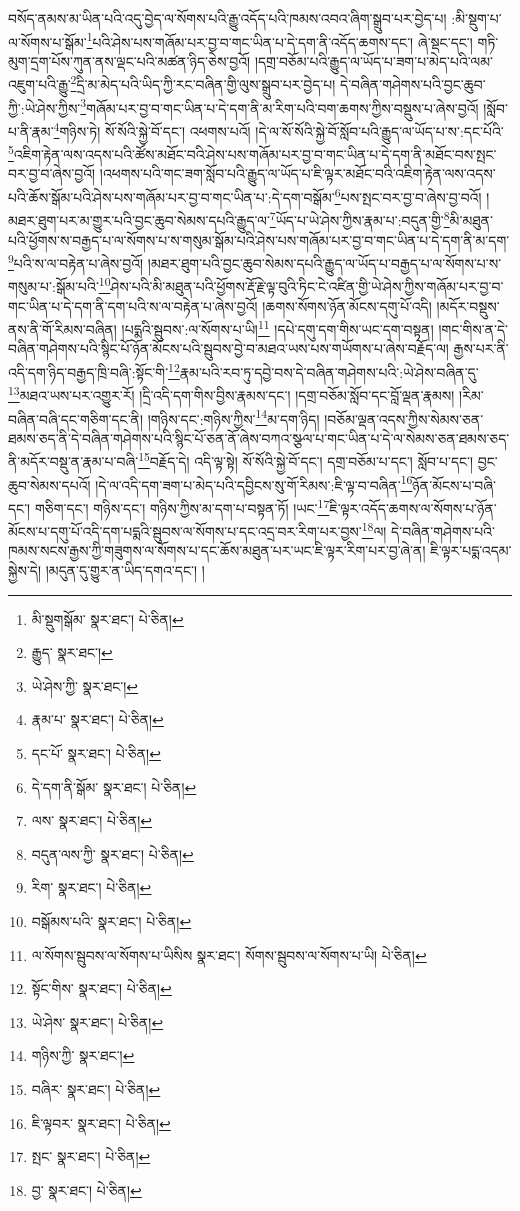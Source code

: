བསོད་ནམས་མ་ཡིན་པའི་འདུ་བྱེད་ལ་སོགས་པའི་རྒྱུ་འདོད་པའི་ཁམས་འབའ་ཞིག་སྒྲུབ་པར་བྱེད་པ། :མི་སྡུག་པ་ལ་སོགས་པ་སྒོམ་\footnote{མི་སྡུགསྒོམ་  སྣར་ཐང་།  པེ་ཅིན། }པའི་ཤེས་པས་གཞོམ་པར་བྱ་བ་གང་ཡིན་པ་དེ་དག་ནི་འདོད་ཆགས་དང་། ཞེ་སྡང་དང་། གཏི་མུག་དྲག་པོས་ཀུན་ནས་ལྡང་པའི་མཚན་ཉིད་ཅེས་བྱའོ། །དགྲ་བཅོམ་པའི་རྒྱུད་ལ་ཡོད་པ་ཟག་པ་མེད་པའི་ལམ་འཇུག་པའི་རྒྱུ་\footnote{རྒྱུད་  སྣར་ཐང་། }དྲི་མ་མེད་པའི་ཡིད་ཀྱི་རང་བཞིན་གྱི་ལུས་སྒྲུབ་པར་བྱེད་པ། དེ་བཞིན་གཤེགས་པའི་བྱང་ཆུབ་ཀྱི་:ཡེ་ཤེས་ཀྱིས་\footnote{ཡེ་ཤེས་ཀྱི་  སྣར་ཐང་། }གཞོམ་པར་བྱ་བ་གང་ཡིན་པ་དེ་དག་ནི་མ་རིག་པའི་བག་ཆགས་ཀྱིས་བསྡུས་པ་ཞེས་བྱའོ། །སློབ་པ་ནི་རྣམ་\footnote{རྣམ་པ་  སྣར་ཐང་།  པེ་ཅིན། }གཉིས་ཏེ། སོ་སོའི་སྐྱེ་བོ་དང་། འཕགས་པའོ། །དེ་ལ་སོ་སོའི་སྐྱེ་བོ་སློབ་པའི་རྒྱུད་ལ་ཡོད་པ་ས་:དང་པོའི་\footnote{དང་པོ་  སྣར་ཐང་།  པེ་ཅིན། }འཇིག་རྟེན་ལས་འདས་པའི་ཚོས་མཐོང་བའི་ཤེས་པས་གཞོམ་པར་བྱ་བ་གང་ཡིན་པ་དེ་དག་ནི་མཐོང་བས་སྤང་བར་བྱ་བ་ཞེས་བྱའོ། །འཕགས་པའི་གང་ཟག་སློབ་པའི་རྒྱུད་ལ་ཡོད་པ་ཇི་ལྟར་མཐོང་བའི་འཇིག་རྟེན་ལས་འདས་པའི་ཆོས་སྒོམ་པའི་ཤེས་པས་གཞོམ་པར་བྱ་བ་གང་ཡིན་པ་:དེ་དག་བསྒོམ་\footnote{དེ་དག་ནི་སྒོམ་  སྣར་ཐང་།  པེ་ཅིན། }པས་སྤང་བར་བྱ་བ་ཞེས་བྱ་བའོ། །མཐར་ཐུག་པར་མ་གྱུར་པའི་བྱང་ཆུབ་སེམས་དཔའི་རྒྱུད་ལ་\footnote{ལས་  སྣར་ཐང་།  པེ་ཅིན། }ཡོད་པ་ཡེ་ཤེས་ཀྱིས་རྣམ་པ་:བདུན་གྱི་\footnote{བདུན་ལས་ཀྱི་  སྣར་ཐང་།  པེ་ཅིན། }མི་མཐུན་པའི་ཕྱོགས་ས་བརྒྱད་པ་ལ་སོགས་པ་ས་གསུམ་སྒོམ་པའི་ཤེས་པས་གཞོམ་པར་བྱ་བ་གང་ཡིན་པ་དེ་དག་ནི་མ་དག་\footnote{རིག་  སྣར་ཐང་།  པེ་ཅིན། }པའི་ས་ལ་བརྟེན་པ་ཞེས་བྱའོ། །མཐར་ཐུག་པའི་བྱང་ཆུབ་སེམས་དཔའི་རྒྱུད་ལ་ཡོད་པ་བརྒྱད་པ་ལ་སོགས་པ་ས་གསུམ་པ་:སྒོམ་པའི་\footnote{བསྒོམས་པའི་  སྣར་ཐང་།  པེ་ཅིན། }ཤེས་པའི་མི་མཐུན་པའི་ཕྱོགས་རྡོ་རྗེ་ལྟ་བུའི་ཏིང་ངེ་འཛིན་གྱི་ཡེ་ཤེས་ཀྱིས་གཞོམ་པར་བྱ་བ་གང་ཡིན་པ་དེ་དག་ནི་དག་པའི་ས་ལ་བརྟེན་པ་ཞེས་བྱའོ། །ཆགས་སོགས་ཉོན་མོངས་དགུ་པོ་འདི། །མདོར་བསྡུས་ནས་ནི་གོ་རིམས་བཞིན། །པདྨའི་སྦུབས་:ལ་སོགས་པ་ཡི།\footnote{ལ་སོགས་སྦུབས་ལ་སོགས་པ་ཡིསིས  སྣར་ཐང་། སོགས་སྦུབས་ལ་སོགས་པ་ཡི།  པེ་ཅིན། } །དཔེ་དགུ་དག་གིས་ཡང་དག་བསྟན། །གང་གིས་ན་དེ་བཞིན་གཤེགས་པའི་སྙིང་པོ་ཉོན་མོངས་པའི་སྦུབས་བྱེ་བ་མཐའ་ཡས་པས་གཡོགས་པ་ཞེས་བརྗོད་ལ། རྒྱས་པར་ནི་འདི་དག་ཉིད་བརྒྱད་ཁྲི་བཞི་:སྟོང་གི་\footnote{སྟོང་གིས་  སྣར་ཐང་།  པེ་ཅིན། }རྣམ་པའི་རབ་ཏུ་དབྱེ་བས་དེ་བཞིན་གཤེགས་པའི་:ཡེ་ཤེས་བཞིན་དུ་\footnote{ཡེ་ཤེས་  སྣར་ཐང་།  པེ་ཅིན། }མཐའ་ཡས་པར་འགྱུར་རོ། །དྲི་འདི་དག་གིས་བྱིས་རྣམས་དང་། །དགྲ་བཅོམ་སློབ་དང་བློ་ལྡན་རྣམས། །རིམ་བཞིན་བཞི་དང་གཅིག་དང་ནི། །གཉིས་དང་:གཉིས་ཀྱིས་\footnote{གཉིས་ཀྱི་  སྣར་ཐང་། }མ་དག་ཉིད། །བཅོམ་ལྡན་འདས་ཀྱིས་སེམས་ཅན་ཐམས་ཅད་ནི་དེ་བཞིན་གཤེགས་པའི་སྙིང་པོ་ཅན་ནོ་ཞེས་བཀའ་སྩལ་པ་གང་ཡིན་པ་དེ་ལ་སེམས་ཅན་ཐམས་ཅད་ནི་མདོར་བསྡུ་ན་རྣམ་པ་བཞི་\footnote{བཞིར་  སྣར་ཐང་།  པེ་ཅིན། }བརྗོད་དེ། འདི་ལྟ་སྟེ། སོ་སོའི་སྐྱེ་བོ་དང་། དགྲ་བཅོམ་པ་དང་། སློབ་པ་དང་། བྱང་ཆུབ་སེམས་དཔའོ། །དེ་ལ་འདི་དག་ཟག་པ་མེད་པའི་དབྱིངས་སུ་གོ་རིམས་:ཇི་ལྟ་བ་བཞིན་\footnote{ཇི་ལྟབར་  སྣར་ཐང་།  པེ་ཅིན། }ཉོན་མོངས་པ་བཞི་དང་། གཅིག་དང་། གཉིས་དང་། གཉིས་ཀྱིས་མ་དག་པ་བསྟན་ཏོ། །ཡང་\footnote{སྤང་  སྣར་ཐང་།  པེ་ཅིན། }ཇི་ལྟར་འདོད་ཆགས་ལ་སོགས་པ་ཉོན་མོངས་པ་དགུ་པོ་འདི་དག་པདྨའི་སྦུབས་ལ་སོགས་པ་དང་འདྲ་བར་རིག་པར་བྱས་\footnote{བྱ་  སྣར་ཐང་།  པེ་ཅིན། }ལ། དེ་བཞིན་གཤེགས་པའི་ཁམས་སངས་རྒྱས་ཀྱི་གཟུགས་ལ་སོགས་པ་དང་ཆོས་མཐུན་པར་ཡང་ཇི་ལྟར་རིག་པར་བྱ་ཞེ་ན། ཇི་ལྟར་པདྨ་འདམ་སྐྱེས་དེ། །མདུན་དུ་གྱུར་ན་ཡིད་དགའ་དང་། །
